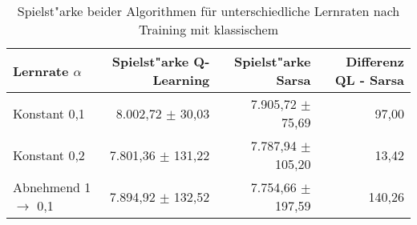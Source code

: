 \begin{table}
\centering
\caption[Spielstärke beider Algorithmen unterschiedliche Lernraten, klassisches \splay]{Spielst"arke beider Algorithmen für unterschiedliche Lernraten nach Training mit klassischem \splay}
\label{tab:playingAbility_compareAlgorithms_normal}

\begin{tabular}{lrrr}
\toprule
Lernrate $\alpha$               & Spielst"arke Q-Learning           & Spielst"arke Sarsa                & Differenz QL - Sarsa \\ \midrule
Konstant 0,1                    & 8.002,72 $\pm$ \phantom{0}30,03   & 7.905,72 $\pm$ \phantom{0}75,69   & 97,00 \\
Konstant 0,2                    & 7.801,36 $\pm$ 131,22             & 7.787,94 $\pm$ 105,20             & 13,42 \\
Abnehmend 1 $\rightarrow$ 0,1   & 7.894,92 $\pm$ 132,52             & 7.754,66 $\pm$ 197,59             & 140,26 \\ \bottomrule

\end{tabular}
\end{table}